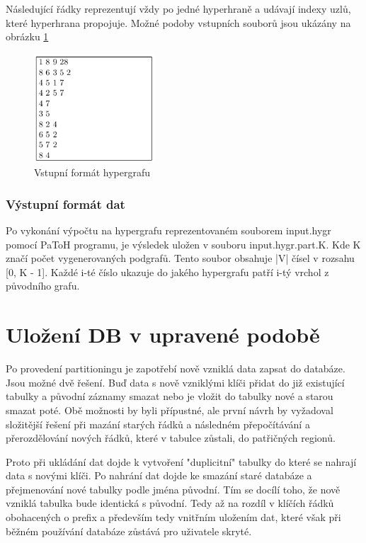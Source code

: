 \documentclass[thesis=M,czech]{FITthesis}[2012/06/26]
\begin{document}
Následující řádky reprezentují vždy po jedné hyperhraně a udávají indexy uzlů, které hyperhrana propojuje. Možné podoby vstupních souborů jsou ukázány na obrázku \ref{fig:input}

\begin{figure}[h]\centering
	\includegraphics[width=0.4\textwidth, angle=0]{files/inputformat}
	\caption[Vstupní formát hypergrafu]
	{Vstupní formát hypergrafu}\label{fig:input}
\end{figure} 
\subsubsection{Výstupní formát dat}
Po vykonání výpočtu na hypergrafu reprezentovaném souborem input.hygr pomocí PaToH programu, je výsledek uložen v souboru input.hygr.part.K. Kde K značí počet vygenerovaných podgrafů. Tento soubor obsahuje |V| čísel v rozsahu [0, K - 1]. Každé i-té číslo ukazuje do jakého hypergrafu patří i-tý vrchol z původního grafu.



\section{Uložení DB v upravené podobě}
Po provedení  partitioningu je zapotřebí nově vzniklá data zapsat do databáze. Jsou možné dvě řešení. Buď data s nově vzniklými klíči přidat do již existující tabulky a původní záznamy smazat nebo je vložit do tabulky nové a starou smazat poté. Obě možnosti by byli přípustné, ale první návrh by vyžadoval složitější řešení při mazání starých řádků a následném přepočítávání a přerozdělování nových řádků, které v tabulce zůstali, do patřičných regionů. 

Proto při ukládání dat dojde k vytvoření "duplicitní" tabulky do které se nahrají data s novými klíči. Po nahrání dat dojde ke smazání staré databáze a přejmenování nové tabulky podle jména původní. Tím se docílí toho, že nově vzniklá tabulka bude identická s původní. Tedy až na rozdíl v klíčích řádků obohacených o prefix a především tedy vnitřním uložením dat, které však při běžném používání databáze zůstává pro uživatele skryté. 
\end{document}
